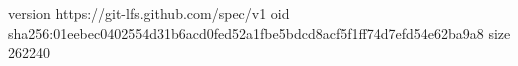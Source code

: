 version https://git-lfs.github.com/spec/v1
oid sha256:01eebec0402554d31b6acd0fed52a1fbe5bdcd8acf5f1ff74d7efd54e62ba9a8
size 262240
